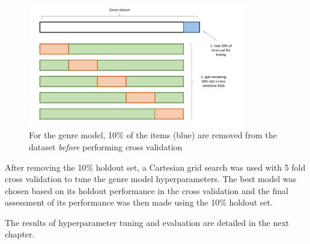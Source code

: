 \begin{figure}[H]
\centering
\includegraphics[width=0.85\textwidth]{Figures/4_cross-validation-2.pdf}
\decoRule
\caption[Holdout set]{For the genre model, 10\% of the items (blue) are removed from the dataset \textit{before} performing cross validation}
\label{fig:4_cross-validation-2}
\end{figure}

After removing the 10\% holdout set, a Cartesian grid search was used with 5 fold cross validation to tune the genre model hyperparameters. The best model was chosen based on its holdout performance in the cross validation and the final assessment of its performance was then made using the 10\% holdout set.

The results of hyperparameter tuning and evaluation are detailed in the next chapter.